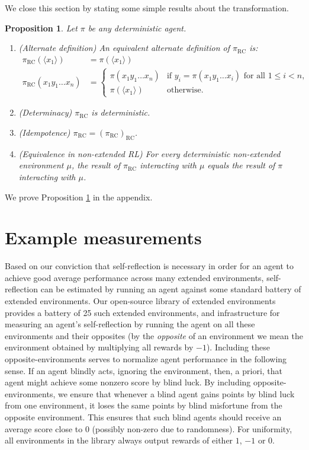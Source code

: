 \documentclass{article}
\newtheorem{myproposition}[mytheorem]{Proposition}
\def\RC{\textrm{RC}}
\begin{document}
We close this section by stating some simple results
about the transformation.

\begin{myproposition}
\label{transformationproposition}
  Let $\pi$ be any deterministic agent.
  \begin{enumerate}
    \item
    (Alternate definition)
    An equivalent alternate definition of $\pi_{\RC}$ is:
    \begin{align*}
      \pi_{\RC}(\langle x_1\rangle) &= \pi(\langle x_1\rangle)\\
      \pi_{\RC}(x_1y_1\ldots x_n) &=
      \begin{cases}
        \pi(x_1y_1\ldots x_n) & \mbox{if $y_i=\pi(x_1y_1\ldots x_i)$ for all $1\leq i<n$,}\\
        \pi(\langle x_1\rangle) & \mbox{otherwise.}
      \end{cases}
    \end{align*}
    \item
    (Determinacy)
    $\pi_{\RC}$ is deterministic.
    \item
    (Idempotence) $\pi_{\RC}=(\pi_{\RC})_{\RC}$.
    \item
    (Equivalence in non-extended RL)
    For every deterministic non-extended environment $\mu$, the result of $\pi_{\RC}$
    interacting with $\mu$ equals the result of $\pi$ interacting with $\mu$.
  \end{enumerate}
\end{myproposition}

We prove Proposition \ref{transformationproposition} in the
appendix.


\section{Example measurements}
\label{measurementssection}

Based on our conviction that self-reflection is necessary in order for an agent to
achieve good average performance across many extended environments, self-reflection can
be estimated by running an agent against some standard battery of extended environments.
Our open-source library of extended environments \cite{library} provides a battery of
25 such extended environments, and infrastructure for measuring an agent's self-reflection
by running the agent on all these environments and their opposites
(by the \emph{opposite} of an environment we mean the environment
obtained by multiplying
all rewards by $-1$). Including these opposite-environments serves to normalize
agent performance in the following sense. If an agent blindly acts, ignoring the environment,
then, a priori, that agent might achieve some nonzero score by blind luck. By including
opposite-environments, we ensure that whenever a blind agent gains points by blind luck
from one environment, it loses the same points by blind misfortune from the opposite
environment. This ensures that such blind agents should receive an average score close to
$0$ (possibly non-zero due to randomness). For uniformity, all environments in the library
always output rewards of either $1$, $-1$ or $0$.
\end{document}
